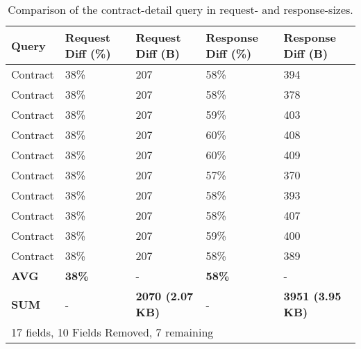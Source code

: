  \ifshowTables
 \begin{table}[H]
   \begin{tabular}{|l|l|l|l|l|}
   \hline
   Query  & Request Diff (\%)  & Request Diff (B) & Response Diff (\%) & Response Diff (B)  \\
   \hline
   Contract & 38\% & 207 & 58\% & 394 \\
   \hline
   Contract & 38\% & 207 & 58\% & 378 \\
   \hline
   Contract & 38\% & 207 & 59\% & 403 \\
   \hline
   Contract & 38\% & 207 & 60\% & 408 \\
   \hline
   Contract & 38\% & 207 & 60\% & 409 \\
   \hline
   Contract & 38\% & 207 & 57\% & 370 \\
   \hline
   Contract & 38\% & 207 & 58\% & 393 \\
   \hline
   Contract & 38\% & 207 & 58\% & 407 \\
   \hline
   Contract & 38\% & 207 & 59\% & 400 \\
   \hline
   Contract & 38\% & 207 & 58\% & 389 \\
   \hline
   \hline
   \textbf{AVG} & \textbf{38\%} & - & \textbf{58\%} & - \\
   \hline
   \textbf{SUM} & - & \textbf{2070 (2.07 KB)} & - & \textbf{3951 (3.95 KB)} \\
   \hline
   \multicolumn{5}{l}{17 fields, 10 Fields Removed, 7 remaining}
   \end{tabular}
   \caption{Comparison of the contract-detail query in request- and response-sizes.}\label{table:code:comparison-contract-reduction}
 \end{table}
 \fi
